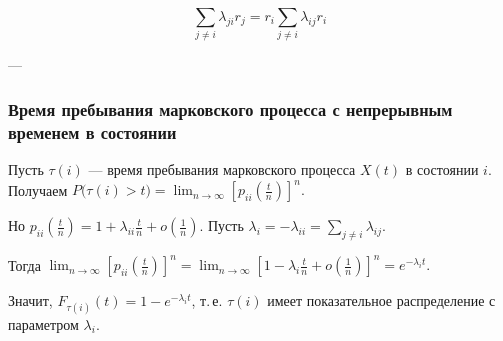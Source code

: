 \[
	\sum_{j \ne i} \lambda_{ji} r_j = r_i \sum_{j \ne i} \lambda_{ij} r_i
\]

---

\subsubsection*{Время пребывания марковского процесса с непрерывным временем в состоянии}

Пусть $\tau(i)$ — время пребывания марковского процесса $X(t)$ в состоянии $i$.
Получаем
$P\bigl(\tau(i) > t\bigr)= \lim_{n \to \infty} [p_{ii}(\frac{t}{n})]^n.$

Но $p_{ii}\!\left(\tfrac{t}{n}\right)= 1 + \lambda_{ii}\tfrac{t}{n} + o\!\left(\tfrac{1}{n}\right).$
Пусть $\lambda_i = -\lambda_{ii} = \sum_{j \ne i} \lambda_{ij}$.

Тогда
$\lim_{n \to \infty} [p_{ii}(\frac{t}{n})]^n
	= \lim_{n \to \infty}
	\left[1 - \lambda_i \tfrac{t}{n} + o\!\left(\tfrac{1}{n}\right)\right]^n
	= e^{-\lambda_i t}.$

Значит, $F_{\tau(i)}(t) = 1 - e^{-\lambda_i t}$,
т.\,е. $\tau(i)$ имеет показатель­ное распределение с параметром $\lambda_i$.
